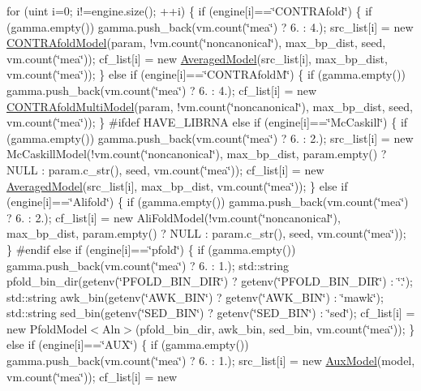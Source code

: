 for (uint i=0; i!=engine.\+size(); ++i) \{ if (engine\mbox{[}i\mbox{]}==\char`\"{}\+C\+O\+N\+T\+R\+Afold\char`\"{}) \{ if (gamma.\+empty()) gamma.\+push\+\_\+back(vm.\+count(\char`\"{}mea\char`\"{}) ? 6. \+: 4.); src\+\_\+list\mbox{[}i\mbox{]} = new \hyperlink{class_c_o_n_t_r_afold_model}{C\+O\+N\+T\+R\+Afold\+Model}(param, !vm.count(\char`\"{}noncanonical\char`\"{}), max\+\_\+bp\+\_\+dist, seed, vm.\+count(\char`\"{}mea\char`\"{})); cf\+\_\+list\mbox{[}i\mbox{]} = new \hyperlink{class_averaged_model}{Averaged\+Model}(src\+\_\+list\mbox{[}i\mbox{]}, max\+\_\+bp\+\_\+dist, vm.\+count(\char`\"{}mea\char`\"{})); \} else if (engine\mbox{[}i\mbox{]}==\char`\"{}\+C\+O\+N\+T\+R\+Afold\+M\char`\"{}) \{ if (gamma.\+empty()) gamma.\+push\+\_\+back(vm.\+count(\char`\"{}mea\char`\"{}) ? 6. \+: 4.); cf\+\_\+list\mbox{[}i\mbox{]} = new \hyperlink{class_c_o_n_t_r_afold_multi_model}{C\+O\+N\+T\+R\+Afold\+Multi\+Model}(param, !vm.count(\char`\"{}noncanonical\char`\"{}), max\+\_\+bp\+\_\+dist, seed, vm.\+count(\char`\"{}mea\char`\"{})); \} \#ifdef H\+A\+V\+E\+\_\+\+L\+I\+B\+R\+N\+A else if (engine\mbox{[}i\mbox{]}==\char`\"{}\+Mc\+Caskill\char`\"{}) \{ if (gamma.\+empty()) gamma.\+push\+\_\+back(vm.\+count(\char`\"{}mea\char`\"{}) ? 6. \+: 2.); src\+\_\+list\mbox{[}i\mbox{]} = new Mc\+Caskill\+Model(!vm.count(\char`\"{}noncanonical\char`\"{}), max\+\_\+bp\+\_\+dist, param.\+empty() ? N\+U\+L\+L \+: param.\+c\+\_\+str(), seed, vm.\+count(\char`\"{}mea\char`\"{})); cf\+\_\+list\mbox{[}i\mbox{]} = new \hyperlink{class_averaged_model}{Averaged\+Model}(src\+\_\+list\mbox{[}i\mbox{]}, max\+\_\+bp\+\_\+dist, vm.\+count(\char`\"{}mea\char`\"{})); \} else if (engine\mbox{[}i\mbox{]}==\char`\"{}\+Alifold\char`\"{}) \{ if (gamma.\+empty()) gamma.\+push\+\_\+back(vm.\+count(\char`\"{}mea\char`\"{}) ? 6. \+: 2.); cf\+\_\+list\mbox{[}i\mbox{]} = new Ali\+Fold\+Model(!vm.count(\char`\"{}noncanonical\char`\"{}), max\+\_\+bp\+\_\+dist, param.\+empty() ? N\+U\+L\+L \+: param.\+c\+\_\+str(), seed, vm.\+count(\char`\"{}mea\char`\"{})); \} \#endif else if (engine\mbox{[}i\mbox{]}==\char`\"{}pfold\char`\"{}) \{ if (gamma.\+empty()) gamma.\+push\+\_\+back(vm.\+count(\char`\"{}mea\char`\"{}) ? 6. \+: 1.); std\+::string pfold\+\_\+bin\+\_\+dir(getenv(\char`\"{}\+P\+F\+O\+L\+D\+\_\+\+B\+I\+N\+\_\+\+D\+I\+R\char`\"{}) ? getenv(\char`\"{}\+P\+F\+O\+L\+D\+\_\+\+B\+I\+N\+\_\+\+D\+I\+R\char`\"{}) \+: \char`\"{}.\char`\"{}); std\+::string awk\+\_\+bin(getenv(\char`\"{}\+A\+W\+K\+\_\+\+B\+I\+N\char`\"{}) ? getenv(\char`\"{}\+A\+W\+K\+\_\+\+B\+I\+N\char`\"{}) \+: \char`\"{}mawk\char`\"{}); std\+::string sed\+\_\+bin(getenv(\char`\"{}\+S\+E\+D\+\_\+\+B\+I\+N\char`\"{}) ? getenv(\char`\"{}\+S\+E\+D\+\_\+\+B\+I\+N\char`\"{}) \+: \char`\"{}sed\char`\"{}); cf\+\_\+list\mbox{[}i\mbox{]} = new Pfold\+Model$<$\+Aln$>$(pfold\+\_\+bin\+\_\+dir, awk\+\_\+bin, sed\+\_\+bin, vm.\+count(\char`\"{}mea\char`\"{})); \} else if (engine\mbox{[}i\mbox{]}==\char`\"{}\+A\+U\+X\char`\"{}) \{ if (gamma.\+empty()) gamma.\+push\+\_\+back(vm.\+count(\char`\"{}mea\char`\"{}) ? 6. \+: 1.); src\+\_\+list\mbox{[}i\mbox{]} = new \hyperlink{class_aux_model}{Aux\+Model}(model, vm.\+count(\char`\"{}mea\char`\"{})); cf\+\_\+list\mbox{[}i\mbox{]} = new 